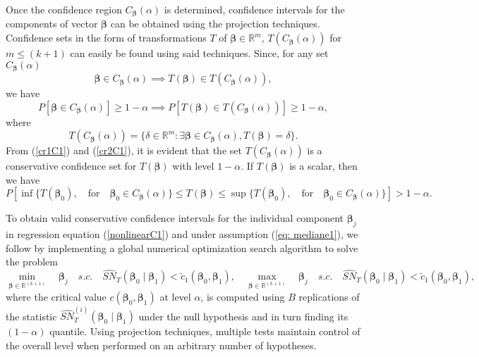 \documentclass[harvard,11pt]{article}
\begin{document}
Once the confidence region $C_{\bm{\beta} }(\alpha )$ is determined, confidence intervals for the components of vector $\bm{\beta} $ can be obtained using the
projection techniques. Confidence sets in the form of transformations $T$ of $\bm{\beta}\in%
\mathbb{R}^{m}$, $T(C_{\bm{\beta} }(\alpha ))$ for $m\leq (k+1)$ can easily be found using said techniques. Since, for any set $C_{\bm{\beta} }(\alpha )$
\begin{equation}
\bm{\beta} \in C_{\bm{\beta} }(\alpha )\implies T(\bm{\beta} )\in T(C_{\bm{\beta} }(\alpha )),
\label{cr1C1}
\end{equation}%
we have
\begin{equation}
P[\bm{\beta} \in C_{\bm{\beta} }(\alpha )]\geq 1-\alpha \implies P%
[T(\bm{\beta} )\in T(C_{\bm{\beta} }(\alpha ))]\geq 1-\alpha,   \label{cr2C1}
\end{equation}%
where
\begin{equation*}
T(C_{\bm{\beta} }(\alpha ))=\{\delta \in \mathbb{R}^{m}:\exists \bm{\beta} \in
C_{\bm{\beta} }(\alpha ),T(\bm{\beta} )=\delta \}.
\end{equation*}%
From (\ref{cr1C1}) and (\ref{cr2C1}), it is evident that the set $T(C_{\bm{\beta} }(\alpha ))$ is a
conservative confidence set for $T(\bm{\beta} )$ with level $1-\alpha $. If $T(\bm{\beta} )$ is a scalar, then we have
\begin{equation*}
P\left[\inf \{T(\bm{\beta} _{0}),\quad\text{for}\quad\bm{\beta}_{0}\in C_{\bm{\beta}
}(\alpha )\}\leq T(\bm{\beta} )\leq \sup \{T(\bm{\beta}_{0}),\quad\text{for}\quad\bm{\beta}
_{0}\in C_{\bm{\beta} }(\alpha )\}\right]>1-\alpha .
\end{equation*}

To obtain valid conservative confidence intervals for the individual component $\bm{\beta}_j$ in regression equation (\ref{nonlinearC1}) and under assumption (\ref{eq: mediane1}), we follow \citet{coudin2009finite} by implementing a global numerical optimization search algorithm to solve the problem
\begin{equation}\label{eq: SA} 
\min\limits_{\bm{\beta}\in\mathbb{R}^{(k+1)}}\quad\bm{\beta}_j\quad s.c.\quad\widehat{SN}_{T}(\bm{\beta}_0\mid\bm{\beta}_1)<\tilde{c}_1(\bm{\beta} _{0},\bm{\beta}_{1}),\quad\max\limits_{\bm{\beta}\in\mathbb{R}^{(k+1)}}\quad\bm{\beta}_j\quad s.c.\quad\widehat{SN}_{T}(\bm{\beta}_0\mid\bm{\beta}_1)<\tilde{c}_1(\bm{\beta}_{0},\bm{\beta}_{1}), 
\end{equation}
where the critical value $c(\bm{\beta}_0,\bm{\beta}_1)$ at level $\alpha$, is computed using $B$ replications of the statistic $\widehat{SN}_{T}^{(i)}(\bm{\beta}_0\mid\bm{\beta}_1)$ under the null hypothesis and in turn finding its $(1-\alpha)$ quantile. Using projection techniques, multiple tests maintain control of the overall level when performed on an arbitrary number of hypotheses. 
\end{document}
